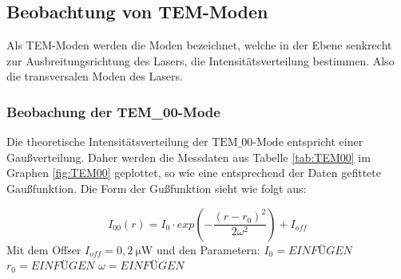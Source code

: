 \subsection{Beobachtung von TEM-Moden}
\label{sec:Beobachtung von TEM-Moden}
Als TEM-Moden werden die Moden bezeichnet, welche in der Ebene senkrecht zur Ausbreitungsrichtung des Lasers, 
die Intensitätsverteilung bestimmen. Also die transversalen Moden des Lasers.

\subsubsection{Beobachung der TEM_{00}-Mode}
\label{sec:Beobachung der 00-Mode}
Die theoretische Intensitätsverteilung der $\text{TEM_{00}-Mode}$ entspricht einer Gaußverteilung. Daher werden die Messdaten aus Tabelle \ref{tab:TEM00} im Graphen \ref{fig:TEM00} geplottet,
so wie eine entsprechend der Daten gefittete Gaußfunktion. Die Form der Gußfunktion sieht wie folgt aus:

\begin{equation}
\label{equ:}
  I_{00}(r) = I_0 \cdot exp \left(- \frac{(r - r_0)^2}{2 \omega^2}\right) + I_{off}
\end{equation}
Mit dem Offser $I_{off} = 0,2 \: \si{\micro\watt}$ und den Parametern:
$I_0 = EINFÜGEN$
$r_0 = EINFÜGEN$
$\omega = EINFÜGEN$



